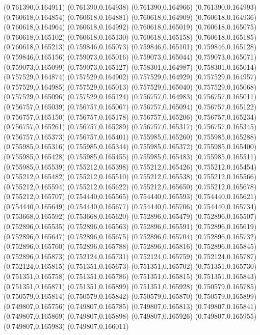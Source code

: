 (0.761390,0.164911)
(0.761390,0.164938)
(0.761390,0.164966)
(0.761390,0.164993)
(0.760618,0.164854)
(0.760618,0.164881)
(0.760618,0.164909)
(0.760618,0.164936)
(0.760618,0.164964)
(0.760618,0.164992)
(0.760618,0.165019)
(0.760618,0.165075)
(0.760618,0.165102)
(0.760618,0.165130)
(0.760618,0.165158)
(0.760618,0.165185)
(0.760618,0.165213)
(0.759846,0.165073)
(0.759846,0.165101)
(0.759846,0.165128)
(0.759846,0.165156)
(0.759073,0.165016)
(0.759073,0.165044)
(0.759073,0.165071)
(0.759073,0.165099)
(0.759073,0.165127)
(0.758301,0.164987)
(0.758301,0.165014)
(0.757529,0.164874)
(0.757529,0.164902)
(0.757529,0.164929)
(0.757529,0.164957)
(0.757529,0.164985)
(0.757529,0.165013)
(0.757529,0.165040)
(0.757529,0.165068)
(0.757529,0.165096)
(0.757529,0.165124)
(0.756757,0.164983)
(0.756757,0.165011)
(0.756757,0.165039)
(0.756757,0.165067)
(0.756757,0.165094)
(0.756757,0.165122)
(0.756757,0.165150)
(0.756757,0.165178)
(0.756757,0.165206)
(0.756757,0.165234)
(0.756757,0.165261)
(0.756757,0.165289)
(0.756757,0.165317)
(0.756757,0.165345)
(0.756757,0.165373)
(0.756757,0.165401)
(0.755985,0.165260)
(0.755985,0.165288)
(0.755985,0.165316)
(0.755985,0.165344)
(0.755985,0.165372)
(0.755985,0.165400)
(0.755985,0.165428)
(0.755985,0.165455)
(0.755985,0.165483)
(0.755985,0.165511)
(0.755985,0.165539)
(0.755212,0.165398)
(0.755212,0.165426)
(0.755212,0.165454)
(0.755212,0.165482)
(0.755212,0.165510)
(0.755212,0.165538)
(0.755212,0.165566)
(0.755212,0.165594)
(0.755212,0.165622)
(0.755212,0.165650)
(0.755212,0.165678)
(0.755212,0.165707)
(0.754440,0.165565)
(0.754440,0.165593)
(0.754440,0.165621)
(0.754440,0.165649)
(0.754440,0.165677)
(0.754440,0.165706)
(0.754440,0.165734)
(0.753668,0.165592)
(0.753668,0.165620)
(0.752896,0.165479)
(0.752896,0.165507)
(0.752896,0.165535)
(0.752896,0.165563)
(0.752896,0.165591)
(0.752896,0.165619)
(0.752896,0.165647)
(0.752896,0.165675)
(0.752896,0.165704)
(0.752896,0.165732)
(0.752896,0.165760)
(0.752896,0.165788)
(0.752896,0.165816)
(0.752896,0.165845)
(0.752896,0.165873)
(0.752124,0.165731)
(0.752124,0.165759)
(0.752124,0.165787)
(0.752124,0.165815)
(0.751351,0.165673)
(0.751351,0.165702)
(0.751351,0.165730)
(0.751351,0.165758)
(0.751351,0.165786)
(0.751351,0.165815)
(0.751351,0.165843)
(0.751351,0.165871)
(0.751351,0.165899)
(0.751351,0.165928)
(0.750579,0.165785)
(0.750579,0.165814)
(0.750579,0.165842)
(0.750579,0.165870)
(0.750579,0.165899)
(0.749807,0.165756)
(0.749807,0.165785)
(0.749807,0.165813)
(0.749807,0.165841)
(0.749807,0.165869)
(0.749807,0.165898)
(0.749807,0.165926)
(0.749807,0.165955)
(0.749807,0.165983)
(0.749807,0.166011)
